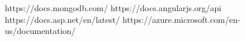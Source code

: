 \begin{thebibliography}{9}

\bibitem https://docs.mongodb.com/
\bibitem https://docs.angularjs.org/api
\bibitem https://docs.asp.net/en/latest/
\bibitem https://azure.microsoft.com/en-us/documentation/
  
\end{thebibliography}